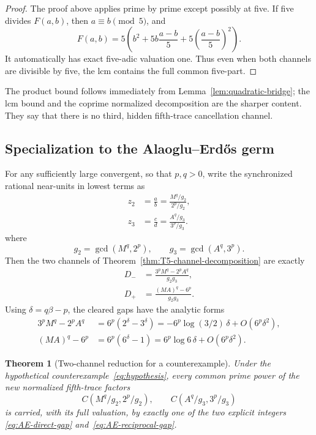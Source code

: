 \documentclass[11pt,oneside]{article}
\newtheorem{theorem}{Theorem}[section]
\theoremstyle{definition}
\theoremstyle{remark}
\begin{document}
\begin{proof}
The proof above applies prime by prime except possibly at five.  If five divides
\(F(a,b)\), then \(a\equiv b\pmod5\), and
\[
 F(a,b)=5\left(b^2+5b\frac{a-b}{5}+5\left(\frac{a-b}{5}\right)^2\right).
\]
It automatically has exact five-adic valuation one.  Thus even when both channels are divisible
by five, the lcm contains the full common five-part.
\end{proof}

The product bound follows immediately from Lemma~\ref{lem:quadratic-bridge}; the lcm bound
and the coprime normalized decomposition are the sharper content.  They say that there is no
third, hidden fifth-trace cancellation channel.

\subsection{Specialization to the Alaoglu--Erd\H{o}s germ}

For any sufficiently large convergent, so that \(p,q>0\), write the synchronized rational
near-units in lowest terms as
\begin{equation}
 \begin{aligned}
 z_2&=\frac ab=\frac{M^q/g_2}{2^p/g_2},\\
 z_3&=\frac cd=\frac{A^q/g_3}{3^p/g_3}.
 \end{aligned}
 \label{eq:reduced-germ}
\end{equation}
where
\begin{equation}
 g_2=\gcd(M^q,2^p),
 \qquad
 g_3=\gcd(A^q,3^p).
 \label{eq:g2g3}
\end{equation}
Then the two channels of Theorem~\ref{thm:T5-channel-decomposition} are exactly
\begin{align}
 D_-&=\frac{3^pM^q-2^pA^q}{g_2g_3},
 \label{eq:AE-direct-gap}\\
 D_+&=\frac{(MA)^q-6^p}{g_2g_3}.
 \label{eq:AE-reciprocal-gap}
\end{align}
Using \(\delta=q\beta-p\), the cleared gaps have the analytic forms
\begin{align}
 3^pM^q-2^pA^q
 &=6^p(2^\delta-3^\delta)
 =-6^p\log(3/2)\,\delta+O(6^p\delta^2),
 \label{eq:direct-asymptotic}\\
 (MA)^q-6^p
 &=6^p(6^\delta-1)
 =6^p\log6\,\delta+O(6^p\delta^2).
 \label{eq:reciprocal-asymptotic}
\end{align}

\begin{theorem}[Two-channel reduction for a counterexample]
\label{thm:AE-two-channel}
Under the hypothetical counterexample~\eqref{eq:hypothesis}, every common prime power of the
new normalized fifth-trace factors
\[
 C(M^q/g_2,2^p/g_2),
 \qquad
 C(A^q/g_3,3^p/g_3)
\]
is carried, with its full valuation, by exactly one of the two explicit integers
\eqref{eq:AE-direct-gap} and~\eqref{eq:AE-reciprocal-gap}.
\end{theorem}
\end{document}
